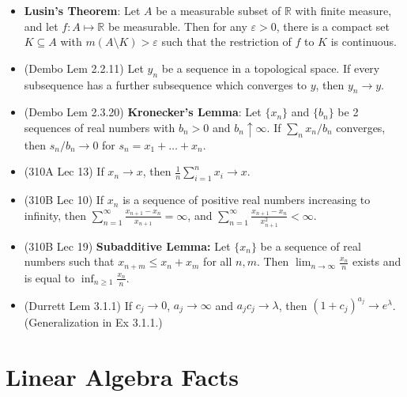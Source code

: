 \documentclass[twoside]{article}
\newcommand{\dis}{\displaystyle}
\newcommand\bbR{\mathbb{R}}
\def\eps{\varepsilon}
\newcommand\lmb{\lambda}
\newcommand\goesto{\rightarrow}
\begin{document}
\begin{itemize}
\item \textbf{Lusin's Theorem}: Let $A$ be a measurable subset of $\bbR$ with finite measure, and let $f: A \mapsto \bbR$ be measurable. Then for any $\eps > 0$, there is a compact set $K \subseteq A$ with $m(A \setminus K) > \eps$ such that the restriction of $f$ to $K$ is continuous.

\item (Dembo Lem 2.2.11) Let $y_n$ be a sequence in a topological space. If every subsequence has a further subsequence which converges to $y$, then $y_n \goesto y$.

\item (Dembo Lem 2.3.20) \textbf{Kronecker's Lemma}: Let $\{ x_n \}$ and $\{ b_n \}$ be 2 sequences of real numbers with $b_n > 0$ and $b_n \uparrow \infty$. If $\sum_n x_n/b_n$ converges, then $s_n / b_n \goesto 0$ for $s_n = x_1 + \dots + x_n$.

\item (310A Lec 13) If $x_n \goesto x$, then $\displaystyle\frac{1}{n}\sum_{i=1}^n x_i \goesto x$.

\item (310B Lec 10) If $x_n$ is a sequence of positive real numbers increasing to infinity, then $\dis\sum_{n=1}^\infty\frac{x_{n+1} - x_n}{x_{n+1}} = \infty$, and $\dis\sum_{n=1}^\infty \frac{x_{n+1} - x_n}{x_{n+1}^2} < \infty$.

\item (310B Lec 19) \textbf{Subadditive Lemma:} Let $\{x_n\}$ be a sequence of real numbers such that $x_{n+m} \leq x_n + x_m$ for all $n, m$. Then $\dis\lim_{n \goesto \infty}\frac{x_n}{n}$ exists and is equal to $\dis\inf_{n \geq 1}\frac{x_n}{n}$.

\item (Durrett Lem 3.1.1) If $c_j \goesto 0$, $a_j \goesto \infty$ and $a_j c_j \goesto \lmb$, then $(1+c_j)^{a_j} \goesto e^\lmb$. (Generalization in Ex 3.1.1.)

\end{itemize}


\section{Linear Algebra Facts}
\end{document}
